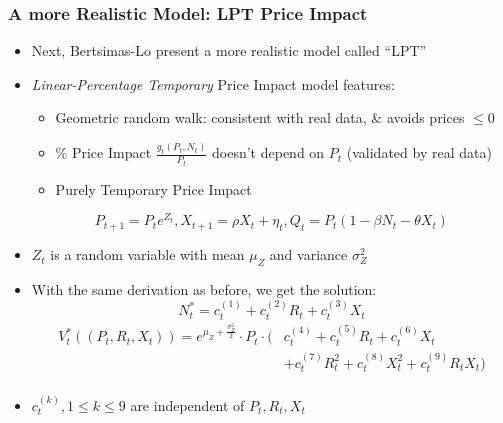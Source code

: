 \documentclass[handout]{beamer}
\begin{document}
\begin{frame}
\frametitle{A more Realistic Model: LPT Price Impact}
\pause
\begin{itemize}
\pause
\item Next, Bertsimas-Lo present a more realistic model called ``LPT''
\pause
\item {\em Linear-Percentage Temporary} Price Impact model features:
\pause
\begin{itemize}
\item Geometric random walk: consistent with real data, \& avoids prices $\leq 0$
\pause
\item \% Price Impact $\frac {g_t(P_t,N_t)} {P_t}$ doesn't depend on $P_t$ (validated by real data)
\pause
\item Purely Temporary Price Impact
\pause
\end{itemize}
$$P_{t+1} = P_t e^{Z_t},  X_{t+1} = \rho X_t + \eta_t, Q_t = P_t(1 - \beta N_t - \theta X_t)$$
\pause
\item $Z_t$ is a random variable with mean $\mu_Z$ and variance $\sigma^2_Z$
\pause
\item With the same derivation as before, we get the solution:
$$N_t^* = c^{(1)}_t + c^{(2)}_t R_t + c^{(3)}_t X_t $$
\pause
\begin{align*}
V^*_t((P_t,R_t,X_t)) = e^{\mu_Z + \frac {\sigma_Z^2} 2} \cdot P_t \cdot ( & c^{(4)}_t + c^{(5)}_t R_t + c^{(6)}_t X_t \\
& + c^{(7)}_t R_t^2 + c^{(8)}_t X_t^2 + c^{(9)}_t R_t X_t)\\
\end{align*}
\pause
\item $c^{(k)}_t, 1 \leq k \leq 9$ are independent of $P_t, R_t, X_t$
\end{itemize}
\end{frame}
\end{document}
